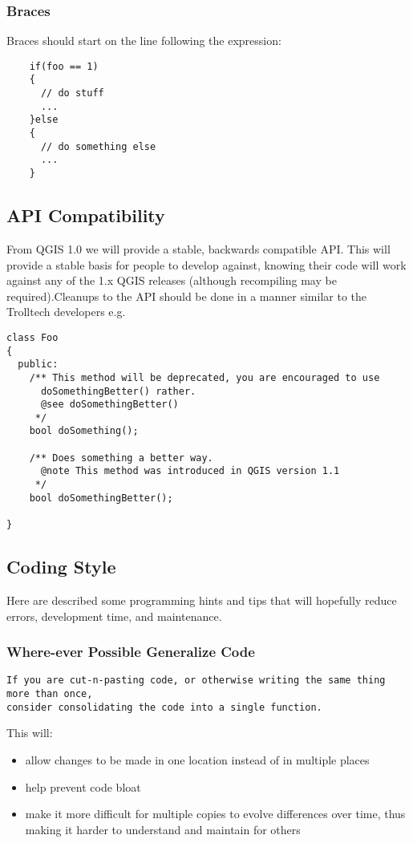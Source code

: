 \subsubsection{Braces}
Braces should start on the line following the expression:

\begin{verbatim}
	if(foo == 1)
	{
	  // do stuff
	  ...
 	}else
	{
	  // do something else
	  ...
	}
\end{verbatim}

\subsection{API Compatibility}
From QGIS 1.0 we will provide a stable, backwards compatible API. This will
provide a stable basis for people to develop against, knowing their code will
work against any of the 1.x QGIS releases (although recompiling may be
required).Cleanups to the API should be done in a manner similar to the
Trolltech developers e.g.

\begin{verbatim}
class Foo 
{
  public:
    /** This method will be deprecated, you are encouraged to use 
      doSomethingBetter() rather.
      @see doSomethingBetter()
     */
    bool doSomething();

    /** Does something a better way.
      @note This method was introduced in QGIS version 1.1
     */
    bool doSomethingBetter();

}
\end{verbatim}

\subsection{Coding Style}
Here are described some programming hints and tips that will hopefully reduce errors, development time, and maintenance.

\subsubsection{Where-ever Possible Generalize Code}
\begin{verbatim}
If you are cut-n-pasting code, or otherwise writing the same thing more than once, 
consider consolidating the code into a single function.
\end{verbatim}

This will:

\begin{itemize}
\item allow changes to be made in one location instead of in multiple places
\item help prevent code bloat
\item make it more difficult for multiple copies to evolve differences over time, thus making it harder to understand and maintain for others
\end{itemize}

